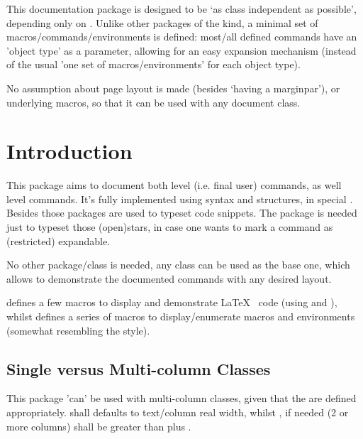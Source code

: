 \documentclass{article}
\begin{document}

  
\begin{typesetabstract}

This documentation package is designed to be `as class independent as possible', depending only on . Unlike other packages of the kind, a minimal set of macros/commands/environments is defined: most/all defined commands have an 'object type' as a  parameter, allowing for an easy expansion mechanism (instead of the usual 'one set of macros/environments' for each object type).

No assumption about page layout is made (besides `having a marginpar'),  or underlying macros, so that it can be used with any document class.

\end{typesetabstract}

\tableofcontents

\section{Introduction}


This package aims to document both  level (i.e. final user) commands, as well  level commands. It's fully implemented using  syntax and structures, in special . Besides those  packages are used to typeset code snippets. The package  is needed just to typeset those (open)stars, in case one wants to mark a command as (restricted) expandable.
 
 
No other package/class is needed, any class can be used as the base one, which allows to demonstrate the documented commands with any desired layout.

 defines a few macros to display and demonstrate \LaTeX~ code (using  and ), whilst  defines a series of macros to display/enumerate macros and environments (somewhat resembling the  style).

\subsection{Single versus Multi-column Classes}
This package 'can' be used with multi-column classes, given that the \tsobj[code]{\linewidth,\columnsep} are defined appropriately. \tsobj{\linewidth} shall defaults to text/column real width, whilst \tsobj{\columnsep}, if needed (2 or more columns) shall be greater than \tsobj{\marginparwidth} plus \tsobj{\marginparsep}.
\end{document}
